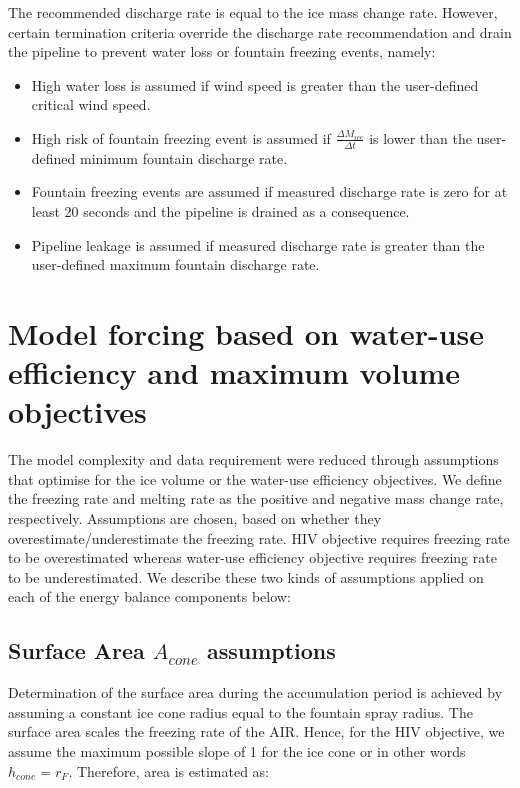 \documentclass[tc, manuscript]{copernicus}
\begin{document}
The recommended discharge rate is equal to the ice mass change rate. However, certain termination criteria
override the discharge rate recommendation and drain the pipeline to prevent water loss or fountain freezing
events, namely: 

\begin{itemize}

\item High water loss is assumed if wind speed is greater than the user-defined critical wind speed.

\item High risk of fountain freezing event is assumed if $\frac{\Delta M_{ice}}{\Delta t}$ is lower than the user-defined minimum fountain discharge rate. 

\item Fountain freezing events are assumed if measured discharge rate is zero for at least 20 seconds and the pipeline is drained as a
  consequence.

\item Pipeline leakage is assumed if measured discharge rate is greater than the user-defined maximum fountain discharge rate.

\end{itemize}

\section{Model forcing based on water-use efficiency and maximum volume objectives} \label{sec:SEB}

The model complexity and data requirement \citep{balasubramanianInfluenceMeteorologicalConditions2022} were
reduced through assumptions that optimise for the ice volume or the water-use efficiency objectives. We define
the freezing rate and melting rate as the positive and negative mass change rate, respectively. Assumptions are
chosen, based on whether they overestimate/underestimate the freezing rate. HIV objective requires freezing rate
to be overestimated whereas water-use efficiency objective requires freezing rate to be underestimated. We
describe these two kinds of assumptions applied on each of the energy balance components below: 

\subsection{Surface Area $A_{cone}$ assumptions}

Determination of the surface area during the accumulation period is achieved by assuming a constant ice cone
radius equal to the fountain spray radius. The surface area scales the freezing rate of the AIR. Hence, for the
HIV objective, we assume the maximum possible slope of 1 for the ice cone or in other words $h_{cone} = r_{F}$.
Therefore, area is estimated as:  
\end{document}
